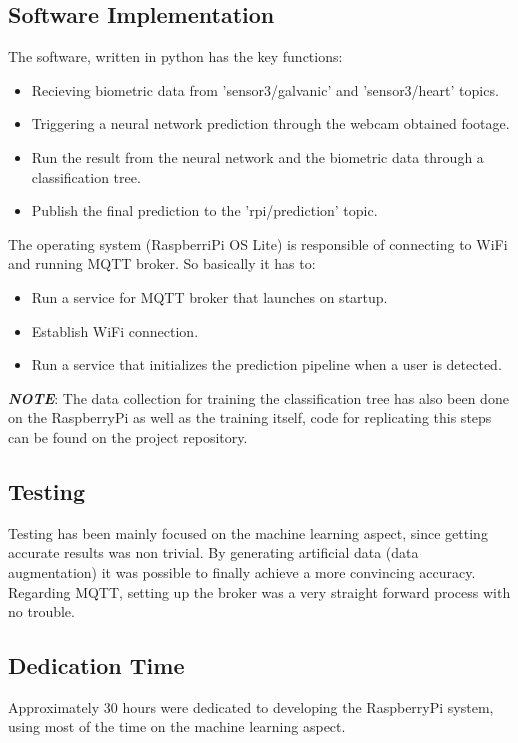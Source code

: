 \documentclass{article}
\begin{document}
\subsection{Software Implementation}
The software, written in python has the key functions:
\begin{itemize}
    \item Recieving biometric data from 'sensor3/galvanic' and 'sensor3/heart' topics.
    \item Triggering a neural network prediction through the webcam obtained footage.
    \item Run the result from the neural network and the biometric data through a classification tree.
    \item Publish the final prediction to the 'rpi/prediction' topic.
\end{itemize}
The operating system (RaspberriPi OS Lite) is responsible of connecting to WiFi and running MQTT broker. So basically it has to:
\begin{itemize}
    \item Run a service for MQTT broker that launches on startup.
    \item Establish WiFi connection.
    \item Run a service that initializes the prediction pipeline when a user is detected.
\end{itemize}

\textbf{\textit{NOTE}}: The data collection for training the classification tree has also been done on the RaspberryPi as well as the training itself, code for replicating this steps can be found on the project repository.

\subsection{Testing}
Testing has been mainly focused on the machine learning aspect, since getting accurate results was non trivial. By generating artificial data (data augmentation) it was possible to finally achieve a more convincing accuracy. Regarding MQTT, setting up the broker was a very straight forward process with no trouble.

\subsection{Dedication Time}
Approximately 30 hours were dedicated to developing the RaspberryPi system, using most of the time on the machine learning aspect.
\end{document}
